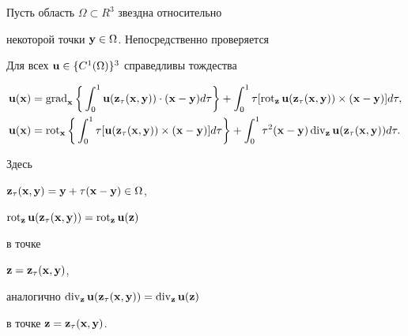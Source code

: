 Пусть область $\Omega\subset R^3$ звездна относительно


некоторой точки $\bold{y}\in\Omega$. Непосредственно проверяется





\begin{thms}


Для всех $\bold{u}\in\{C^1(\Omega)\}^3$ справедливы тождества


\begin{align}


\label{1}


\bold{u}(\bold{x})&=


\Grad_{\bold{x}}\bigg\{\int_0^1\bold{u}(\bold{z}_{\tau}


(\bold{x},\bold{y}))\cdot (\bold{x}-\bold{y})d\tau\bigg\}+\int_0^1\tau


[\Rot_{\bold{z}}\bold{u}(\bold{z}_{\tau}


(\bold{x},\bold{y}))\times (\bold{x}-\bold{y})]d\tau, \\


%


\label{2}


\bold{u}(\bold{x})&=\Rot_{\bold{x}}\bigg\{\int_0^1\tau[\bold{u}


(\bold{z}_{\tau}(\bold{x},\bold{y}))\times (\bold{x}-\bold{y})]d\tau\bigg\}


+\int_0^1\tau^2(\bold{x}-\bold{y})\Div_{\bold{z}}\bold{u}


(\bold{z}_{\tau}(\bold{x},\bold{y}))d\tau.


\end{align}


Здесь


$\bold{z}_{\tau}(\bold{x},\bold{y})=\bold{y}+\tau


(\bold{x}-\bold{y})\in\Omega$,


$\Rot_{\bold{z}}\bold{u}(\bold{z}_{\tau}(\bold{x},\bold{y}))=


\Rot_{\bold{z}}\bold{u}(\bold{z})$


в точке


${\bold{z}=\bold{z}_{\tau}(\bold{x},\bold{y})}$,


аналогично $\Div_{\bold{z}}\bold{u}(\bold{z}_


{\tau}(\bold{x},\bold{y}))=\Div_{\bold{z}}\bold{u}(\bold{z})$


в точке $\bold{z}=\bold{z}_{\tau}(\bold{x},\bold{y})$.


\end{thms}





